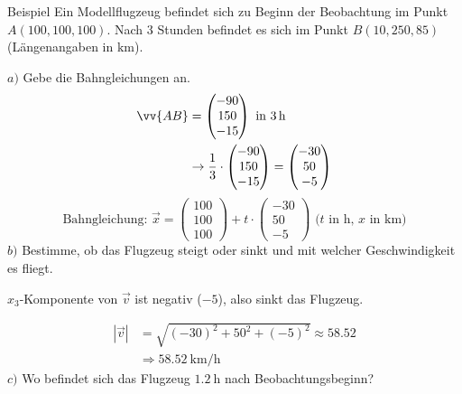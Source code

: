 \documentclass{article}
\begin{document}
    \begin{boxx}[DarkBlue]{Beispiel}
        Ein Modellflugzeug befindet sich zu Beginn der Beobachtung im Punkt $A(100,100,100)$.
        Nach 3 Stunden befindet es sich im Punkt $B(10,250,85)$ (Längenangaben in $\unit{\kilo\meter}$).

        $a)$\hspace{3mm} Gebe die Bahngleichungen an.
        \begin{align*}
            \vv{AB} &= \begin{pmatrix}-90\\150\\-15\end{pmatrix} \text{ in } \qty{3}{\hour} \\
            &\rightarrow \frac{1}{3} \cdot \begin{pmatrix}-90\\150\\-15\end{pmatrix}  = \begin{pmatrix}-30\\50\\-5\end{pmatrix}
        \end{align*}
        \[\text{Bahngleichung: } \vec{x} = \begin{pmatrix}100\\100\\100\end{pmatrix} + t \cdot \begin{pmatrix}-30\\50\\-5\end{pmatrix} \text{ ($t$ in $\unit{\hour}$, $x$ in $\unit{\kilo\meter}$)}\]
        $b)$\hspace{3mm} Bestimme, ob das Flugzeug steigt oder sinkt und mit welcher Geschwindigkeit es fliegt.
        \begin{center}
            $x_3$-Komponente von $\vec{v}$ ist negativ ($-5$), also sinkt das Flugzeug.
        \end{center}
        \begin{align*}
            |\vec{v}| &= \sqrt{(-30)^2 + 50^2 + (-5)^2} \approx 58.52 \\
            &\Rightarrow \qty{58.52}{\kilo\meter\per\hour}
        \end{align*}
        $c)$\hspace{3mm} Wo befindet sich das Flugzeug $\qty{1.2}{\hour}$ nach Beobachtungsbeginn?
            \begin{align*}

\end{align*}
\end{boxx}
\end{document}
